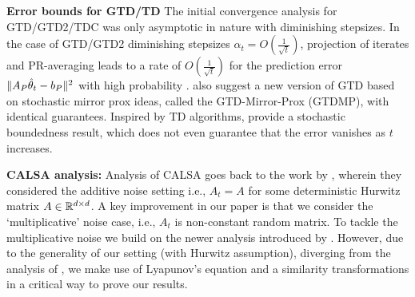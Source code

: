 \textbf{Error bounds for GTD/TD} The initial convergence analysis for GTD/GTD2/TDC was only asymptotic in nature \cite{gtd,gtd2} with diminishing stepsizes.
In the case of GTD/GTD2 diminishing stepsizes $\alpha_t=O(\frac{1}{\sqrt{t}})$, projection of iterates and PR-averaging leads to a rate of $O(\frac{1}{\sqrt{t}})$ 
for the prediction error $\| A_P\hat{\theta}_t-b_P\|^2$ with high probability \cite{gtdmp}. 
\citet{gtdmp} also suggest a new version of GTD based on stochastic mirror prox ideas, called the GTD-Mirror-Prox (GTDMP), with identical guarantees.
Inspired by TD algorithms, \citet{dalal} provide a stochastic boundedness result, 
which does not even guarantee that the error vanishes as $t$ increases.

\textbf{CALSA analysis:} Analysis of CALSA goes back to the work by \citet{polyak-judisky}, wherein they considered the additive noise setting i.e., $A_t=A$ for some deterministic Hurwitz matrix $A\in \mathbb{R}^{d \times d}$. A key improvement in our paper is that we consider the `multiplicative' noise case, i.e., $A_t$ is non-constant random matrix. To tackle the multiplicative noise we build on the newer analysis introduced by \citet{bach}. However, due to the generality of our setting (with Hurwitz assumption), diverging from the analysis of \citeauthor{bach},
 we make use of Lyapunov's equation and a similarity transformations in a critical way to prove our results.

